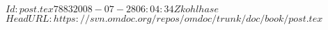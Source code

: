 \svnInfo $Id: post.tex 7883 2008-07-28 06:04:34Z kohlhase $
\svnKeyword $HeadURL: https://svn.omdoc.org/repos/omdoc/trunk/doc/book/post.tex $

 
\newpage
{\small\printindex}


